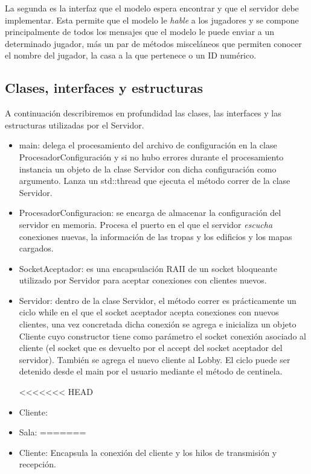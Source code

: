 \documentclass[titlepage,a4paper,12pt]{article}
\begin{document}
La segunda es la interfaz que el modelo espera encontrar y que el servidor debe implementar. Esta permite que el modelo le \textit{hable} a los jugadores y se compone principalmente de todos los mensajes que el modelo le puede enviar a un determinado jugador, más un par de métodos misceláneos que permiten conocer el nombre del jugador, la casa a la que pertenece o un ID numérico.

\subsection{Clases, interfaces y estructuras}

A continuación describiremos en profundidad las clases, las interfaces y las estructuras utilizadas por el Servidor.

\begin{itemize}

\item main: delega el procesamiento del archivo de configuración en la clase ProcesadorConfiguración y si no hubo errores durante el procesamiento instancia un objeto de la clase Servidor con dicha configuración como argumento. Lanza un std::thread que ejecuta el método correr de la clase Servidor.

\item ProcesadorConfiguracion: se encarga de almacenar la configuración del servidor en memoria. Procesa el puerto en el que el servidor \textit{escucha}  conexiones nuevas, la información de las tropas y los edificios y los mapas cargados.

\item SocketAceptador: es una encapsulación RAII de un socket bloqueante utilizado por Servidor para aceptar conexiones con clientes nuevos.

\item Servidor: dentro de la clase Servidor, el método correr es prácticamente un ciclo while en el que el socket aceptador acepta conexiones con nuevos clientes, una vez concretada dicha conexión se agrega e inicializa un objeto Cliente cuyo constructor tiene como parámetro el socket conexión asociado al cliente (el socket que es devuelto por el accept del socket aceptador del servidor). También se agrega el nuevo cliente al Lobby. El ciclo puede ser detenido desde el main por el usuario mediante el método de centinela.

<<<<<<< HEAD
\item Cliente:

\item Sala:
=======
\item Cliente: Encapsula la conexión del cliente y los hilos de transmisión y recepción.


\end{itemize}
\end{document}
